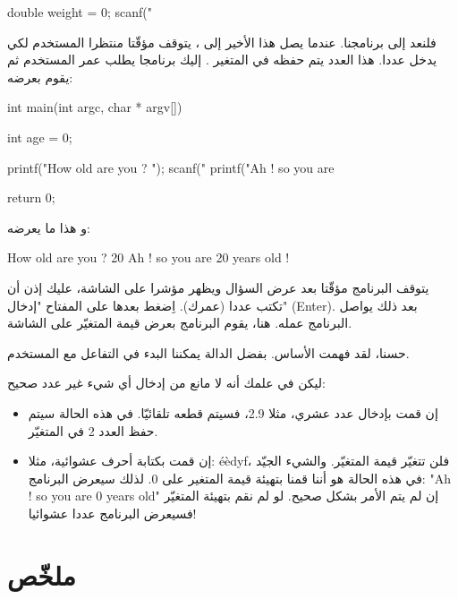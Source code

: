 \begin{Csource}
double weight = 0;
scanf("%
\end{Csource}

فلنعد إلى برنامجنا. عندما يصل هذا الأخير إلى
،
يتوقف مؤقّتا منتظرا المستخدم لكي يدخل عددا. هذا العدد يتم حفظه في المتغير
.
إليك برنامجا يطلب عمر المستخدم ثم يقوم بعرضه:

\begin{Csource}
int main(int argc, char * argv[])
{
  int age = 0;

  printf("How old are you ? ");
  scanf("%
  printf("Ah ! so you are %

  return 0;
}
\end{Csource}

و هذا ما يعرضه:

\begin{Console}
How old are you ? 20
Ah ! so you are 20 years old !

\end{Console}

يتوقف البرنامج مؤقّتا بعد عرض السؤال ويظهر مؤشرا على الشاشة، عليك إذن أن تكتب عددا (عمرك). اِضغط بعدها على المفتاح "إدخال"
(\textenglish{Enter}).
بعد ذلك يواصل البرنامج عمله. هنا، يقوم البرنامج بعرض قيمة المتغيّر
على الشاشة.

حسنا، لقد فهمت الأساس. بفضل الدالة
 يمكننا البدء في التفاعل مع المستخدم.

 ليكن في علمك أنه لا مانع من إدخال أي شيء غير عدد صحيح:
 
 \begin{itemize}
   \item إن قمت بإدخال عدد عشري، مثلا 2.9، فسيتم قطعه تلقائيّا. في هذه الحالة سيتم حفظ العدد 2 في المتغيّر.
   \item إن قمت بكتابة أحرف عشوائية، مثلا:
\textenglish{éèdyf}،
فلن تتغيّر قيمة المتغيّر. والشيء الجيّد في هذه الحالة هو أننا قمنا بتهيئة قيمة المتغير على 0. لذلك سيعرض البرنامج:
"\textenglish{Ah ! so you are 0 years old}"
 إن لم يتم الأمر بشكل صحيح. لو لم نقم بتهيئة المتغيّر فسيعرض البرنامج عددا عشوائيا!
 \end{itemize}

\section*{ملخّص}

